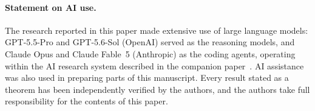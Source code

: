   \paragraph{Statement on AI use.}
  The research reported in this paper made extensive use of large language      
  models: GPT-5.5-Pro and GPT-5.6-Sol (OpenAI) served as the reasoning          
  models, and Claude Opus and Claude Fable~5 (Anthropic) as the coding          
  agents, operating within the AI research system described in the companion    paper~\cite{lisaha2026longhorizon}.               
  AI assistance was also used in preparing parts of this manuscript.            
  Every result stated as a theorem has been independently verified by the       
  authors, and the authors take full responsibility for the contents of this    
  paper. 